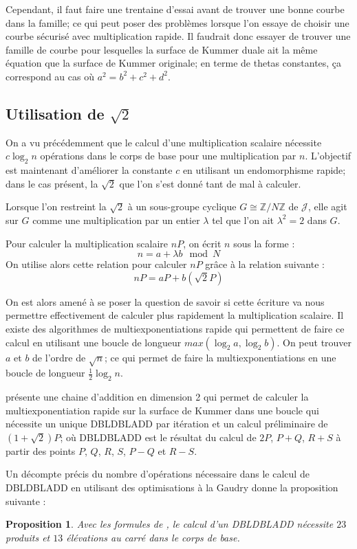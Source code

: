 \documentclass[a4paper]{article}
\newtheorem{proposition}[theoreme]{Proposition}
\theoremstyle{definition}
\theoremstyle{remark}
\numberwithin{equation}{section}
\begin{document}
Cependant, il faut faire une trentaine d'essai avant de trouver une bonne courbe dans la famille; ce qui peut poser des problèmes lorsque l'on essaye de choisir une courbe sécurisé avec multiplication rapide. Il faudrait donc essayer de trouver une famille de courbe pour lesquelles la surface de Kummer duale ait la même équation que la surface de Kummer originale; en terme de thetas constantes, ça correspond au cas où $a^2 = b^2 + c^2 + d^2$.


\subsection{Utilisation de $\sqrt{2}$}

On a vu précédemment que le calcul d'une multiplication scalaire nécessite $c \log_2 n$ opérations dans le corps de base pour une multiplication par $n$. L'objectif est maintenant d'améliorer la constante $c$ en utilisant un endomorphisme rapide; dans le cas présent, la $\sqrt{2}$ que l'on s'est donné tant de mal à calculer.

Lorsque l'on restreint la $\sqrt{2}$ à un sous-groupe cyclique $G \cong \mathbb{Z}/N\mathbb{Z}$ de $\mathcal{J}$, elle agit sur $G$ comme une multiplication par un entier $\lambda$ tel que l'on ait $\lambda^2 = 2$ dans $G$.

Pour calculer la multiplication scalaire $nP$, on écrit $n$ sous la forme :
$$ n = a + \lambda b \mod N$$
On utilise alors cette relation pour calculer $nP$ grâce à la relation suivante :
$$nP = aP + b(\sqrt{2}P)$$

On est alors amené à se poser la question de savoir si cette écriture va nous permettre effectivement de calculer plus rapidement la multiplication scalaire. Il existe des algorithmes de multiexponentiations rapide qui permettent de faire ce calcul en utilisant une boucle de longueur $max(\log_2 a, \log_2 b)$. On peut trouver $a$ et $b$ de l'ordre de $\sqrt{n}$; ce qui permet de faire la multiexponentiations en une boucle de longueur $\frac{1}{2}\log_2 n$.

\citet{bernstein} présente une chaine d'addition en dimension 2 qui permet de calculer la multiexponentiation rapide sur la surface de Kummer dans une boucle qui nécessite un unique DBLDBLADD par itération et un calcul préliminaire de $(1+\sqrt{2})P$; où DBLDBLADD est le résultat du calcul de $2P$, $P+Q$, $R+S$ à partir des points $P$, $Q$, $R$, $S$, $P-Q$ et $R-S$.

Un décompte précis du nombre d'opérations nécessaire dans le calcul de DBLDBLADD en utilisant des optimisations à la Gaudry donne la proposition suivante :
\begin{proposition}
Avec les formules de \citep{gaudry}, le calcul d'un DBLDBLADD nécessite $23$ produits et $13$ élévations au carré dans le corps de base.
\end{proposition}
\end{document}
